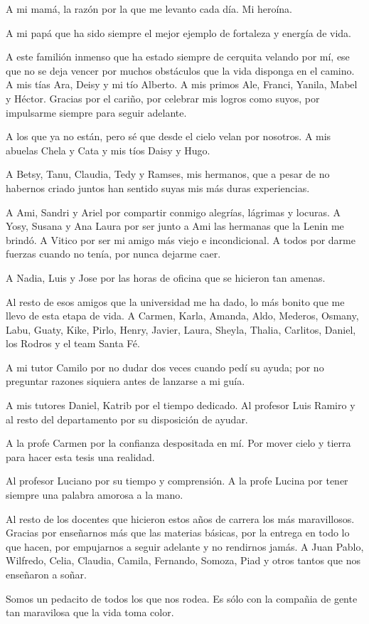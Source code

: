 \begin{acknowledgements}
	A mi mam\'a, la raz\'on por la que me levanto cada d\'ia. Mi hero\'ina.
	
	A mi pap\'a que ha sido siempre el mejor ejemplo de fortaleza y energ\'ia de vida.
	
	A este famili\'on inmenso que ha estado siempre de cerquita velando por m\'i, ese que no se deja vencer por muchos obst\'aculos que la vida disponga en el camino. A mis t\'ias Ara, Deisy y mi t\'io Alberto. A mis primos Ale, Franci, Yanila, Mabel y H\'ector. Gracias por el cari\~no, por celebrar mis logros como suyos, por impulsarme siempre para seguir adelante.
	
	A los que ya no est\'an, pero s\'e que desde el cielo velan por nosotros. A mis abuelas Chela y Cata y mis t\'ios Daisy y Hugo.
	
	A Betsy, Tanu, Claudia, Tedy y Ramses, mis hermanos, que a pesar de no habernos criado juntos han sentido suyas mis m\'as duras experiencias.
	
	A Ami, Sandri y Ariel por compartir conmigo alegr\'ias, l\'agrimas y locuras. A Yosy, Susana y Ana Laura por ser junto a Ami las hermanas que la Lenin me brind\'o. A Vitico por ser mi amigo m\'as viejo e incondicional. A todos por darme fuerzas cuando no ten\'ia, por nunca dejarme caer.
	
	A Nadia, Luis y Jose por las horas de oficina que se hicieron tan amenas.
	
	Al resto de esos amigos que la universidad me ha dado, lo m\'as bonito que me llevo de esta etapa de vida. A Carmen, Karla, Amanda, Aldo, Mederos, Osmany, Labu, Guaty, Kike, Pirlo, Henry, Javier, Laura, Sheyla, Thalia, Carlitos, Daniel, los Rodros y el team Santa F\'e.
	
	A mi tutor Camilo por no dudar dos veces cuando ped\'i su ayuda; por no preguntar razones siquiera antes de lanzarse a mi gu\'ia.
	
	A mis tutores Daniel, Katrib por el tiempo dedicado. Al profesor Luis Ramiro y al resto del departamento por su disposici\'on de ayudar. 
	
	A la profe Carmen por la confianza despositada en m\'i. Por mover cielo y tierra para hacer esta tesis una realidad.
	
	Al profesor Luciano por su tiempo y comprensi\'on. A la profe Lucina por tener siempre una palabra amorosa a la mano.
	
	Al resto de los docentes que hicieron estos a\~nos de carrera los m\'as maravillosos. Gracias por ense\~narnos m\'as que las materias b\'asicas, por la entrega en todo lo que hacen, por empujarnos a seguir adelante y no rendirnos jam\'as. A Juan Pablo, Wilfredo, Celia, Claudia, Camila, Fernando, Somoza, Piad y otros tantos que nos ense\~naron a so\~nar.
	
	Somos un pedacito de todos los que nos rodea. Es s\'olo con la compa\~nia de gente tan maravilosa que la vida toma color.
\end{acknowledgements}